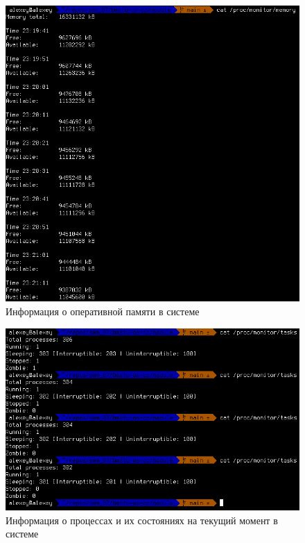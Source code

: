 \begin{figure}[h!]
	\begin{center}
		\includegraphics[scale=0.6]{img/memory_example.png}
	\end{center}
	\captionsetup{justification=centering}
	\caption{Информация о оперативной памяти в системе}
	\label{img:memory_example}
\end{figure}

\begin{figure}[h!]
	\begin{center}
		\includegraphics[scale=0.6]{img/tasks_example.png}
	\end{center}
	\captionsetup{justification=centering}
	\caption{Информация о процессах и их состояниях на текущий момент в системе}
	\label{img:tasks_example}
\end{figure}

